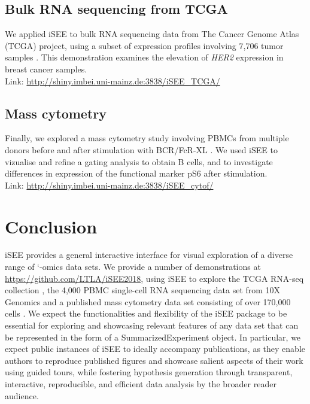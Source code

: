 \documentclass[10pt,a4paper,twocolumn]{article}
\begin{document}
\subsection*{Bulk RNA sequencing from TCGA}
We applied iSEE to bulk RNA sequencing data from The Cancer Genome Atlas (TCGA) project, using a subset of expression profiles involving 7,706 tumor samples \citep{piccolo2015TCGA}.
This demonstration examines the elevation of \textit{HER2} expression in breast cancer samples.\\

Link: \url{http://shiny.imbei.uni-mainz.de:3838/iSEE_TCGA/}

\subsection*{Mass cytometry}
Finally, we explored a mass cytometry study involving PBMCs from multiple donors before and after stimulation with BCR/FcR-XL \citep{bodenmiller2012cytof}.
We used iSEE to vizualise and refine a gating analysis to obtain B cells, and to investigate differences in expression of the functional marker pS6 after stimulation.\\

Link: \url{http://shiny.imbei.uni-mainz.de:3838/iSEE_cytof/}

\section*{Conclusion}
iSEE provides a general interactive interface for visual exploration of a diverse range of `-omics data sets.
We provide a number of demonstrations at \url{https://github.com/LTLA/iSEE2018}, using iSEE to explore the TCGA RNA-seq collection \citep{piccolo2015TCGA}, the 4,000 PBMC single-cell RNA sequencing data set from 10X Genomics \citep{zheng2017massively} and a published mass cytometry data set consisting of over 170,000 cells \citep{bodenmiller2012cytof}.
We expect the functionalities and flexibility of the iSEE package to be essential for exploring and showcasing relevant features of any data set that can be represented in the form of a SummarizedExperiment object.
In particular, we expect public instances of iSEE to ideally accompany publications, as they enable authors to reproduce published figures and showcase salient aspects of their work using guided tours, while fostering hypothesis generation through transparent, interactive, reproducible, and efficient data analysis by the broader reader audience.
\end{document}
